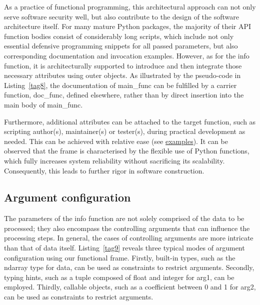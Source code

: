 \documentclass[a4paper,12pt]{article}
\newcommand{\mycode}[1]{{\color{black}Listing~\ref{#1}}}
\newcommand{\inlinecode}[1]{{\ttfamily\footnotesize{#1}}}
\begin{document}


As a practice of functional programming, this architectural approach can not only serve software security well, but also contribute to the design of the software architecture itself. For many mature Python packages, the majority of their API function bodies consist of considerably long scripts, which include not only essential defensive programming snippets for all passed parameters, but also corresponding documentation and invocation examples. However, as for the info function, it is architecturally supported to introduce and then integrate those necessary attributes using outer objects. As illustrated by the pseudo-code in \mycode{tag8}, the documentation of \inlinecode{main\_func} can be fulfilled by a carrier function, \inlinecode{doc\_func}, defined elsewhere, rather than by direct insertion into the main body of \inlinecode{main\_func}.\par



Furthermore, additional attributes can be attached to the target function, such as scripting author(s), maintainer(s) or tester(s), during practical development as needed. This can be achieved with relative ease (see \href{https://informatics.readthedocs.io/en/latest/interface/api\_frame.html#customize-function-by-decorator}{examples}). It can be observed that the frame is characterised by the flexible use of Python functions, which fully increases system reliability without sacrificing its scalability. Consequently, this leads to further rigor in software construction.\par

\subsection*{Argument configuration}

The parameters of the info function are not solely comprised of the data to be processed; they also encompass the controlling arguments that can influence the processing steps. In general, the cases of controlling arguments are more intricate than that of data itself. \mycode{tag9} reveals three typical modes of argument configuration using our functional frame. Firstly, built-in types, such as the \inlinecode{ndarray} type for \inlinecode{data}, can be used as constraints to restrict arguments. Secondly, typing hints, such as a tuple composed of float and integer for \inlinecode{arg1}, can be employed. Thirdly, callable objects, such as a coefficient between 0 and 1 for \inlinecode{arg2}, can be used as constraints to restrict arguments.\par
\end{document}
